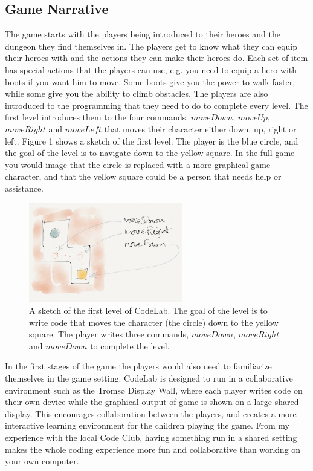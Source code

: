 \documentclass[12pt,journal,compsoc, a4paper, onecolumn]{IEEEtran}
\begin{document}
\subsection{Game Narrative} 
The game starts with the players being introduced to their heroes and the
dungeon they find themselves in. The players get to know what they can equip
their heroes with and the actions they can make their heroes do. Each set of
item has special actions that the players can use, e.g. you need to equip a hero
with boots if you want him to move. Some boots give you the power to walk
faster, while some give you the ability to climb obstacles. The players are also
introduced to the programming that they need to do to complete every level. The
first level introduces them to the four commands: $moveDown$, $moveUp$,
$moveRight$ and $moveLeft$ that moves their character either down, up, right or
left. Figure 1 shows a sketch of the first level. The player is the blue circle,
and the goal of the level is to navigate down to the yellow square.  In the full
game you would image that the circle is replaced with a more graphical game
character, and that the yellow square could be a person that needs help or
assistance. 

\begin{figure}[htb!]
    \begin{centering}
    \includegraphics[width=0.6\textwidth]{./figures/codelab3.png}
    \caption{A sketch of the first level of CodeLab. The goal of the level
    is to write code that moves the character (the circle) down to the
    yellow square. The player writes three commands, $moveDown$,
    $moveRight$ and $moveDown$ to complete the level. } 
    \label{fig:level1}
    \end{centering} 
\end{figure}


In the first stages of the game the players would also need to familiarize
themselves in the game setting. CodeLab is designed to run in a collaborative
environment such as the Tromsø Display Wall, where each player writes code on
their own device while the graphical output of game is shown on a large shared
display. This encourages collaboration between the players, and creates a more
interactive learning environment for the children playing the game. From my
experience with the local Code Club, having something run in a shared setting
makes the whole coding experience more fun and collaborative than working on
your own computer. 
\end{document}
